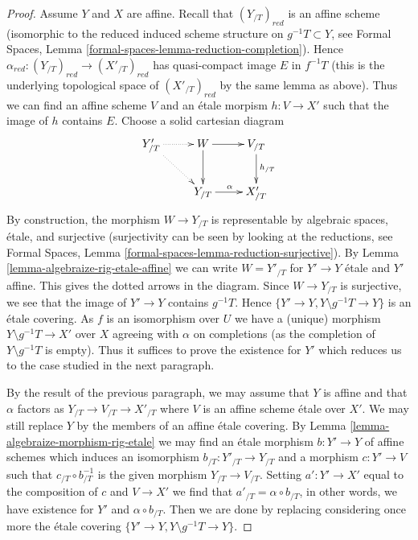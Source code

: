 \documentclass{stacks-project}
\theoremstyle{plain}
\theoremstyle{definition}
\theoremstyle{remark}
\numberwithin{equation}{subsection}
\begin{document}
\begin{proof}
\medskip\noindent
Assume $Y$ and $X$ are affine. Recall that $(Y_{/T})_{red}$
is an affine scheme (isomorphic to the reduced induced scheme structure
on $g^{-1}T \subset Y$, see Formal Spaces, Lemma
\ref{formal-spaces-lemma-reduction-completion}).
Hence $\alpha_{red} : (Y_{/T})_{red} \to (X'_{/T})_{red}$
has quasi-compact image $E$ in $f^{-1}T$ (this is the underlying
topological space of $(X'_{/T})_{red}$ by the same lemma as above).
Thus we can find an affine scheme $V$ and an \'etale morpism
$h : V \to X'$ such that the image of $h$ contains $E$.
Choose a solid cartesian diagram
$$
\xymatrix{
Y'_{/T} \ar@{..>}[rd] \ar@{..>}[r] &
W \ar[d] \ar[r] & V_{/T} \ar[d]^{h_{/T}} \\
& Y_{/T} \ar[r]^\alpha & X'_{/T}
}
$$
By construction, the morphism $W \to Y_{/T}$ is representable by
algebraic spaces, \'etale, and surjective
(surjectivity can be seen by looking at the reductions, see
Formal Spaces, Lemma
\ref{formal-spaces-lemma-reduction-surjective}).
By Lemma \ref{lemma-algebraize-rig-etale-affine}
we can write $W = Y'_{/T}$ for $Y' \to Y$ \'etale and $Y'$ affine.
This gives the dotted arrows in the diagram.
Since $W \to Y_{/T}$ is surjective, we see that
the image of $Y' \to Y$ contains $g^{-1}T$.
Hence $\{Y' \to Y, Y \setminus g^{-1}T \to Y\}$
is an \'etale covering. As $f$ is an isomorphism over $U$ we have a
(unique) morphism $Y \setminus g^{-1}T \to X'$ over $X$
agreeing with $\alpha$ on completions
(as the completion of $Y \setminus g^{-1}T$ is empty).
Thus it suffices to prove the existence for $Y'$
which reduces us to the case studied in the next paragraph.

\medskip\noindent
By the result of the previous paragraph, we may assume that $Y$ is affine
and that $\alpha$ factors as $Y_{/T} \to V_{/T} \to X'_{/T}$
where $V$ is an affine scheme \'etale over $X'$. We may still replace $Y$ by
the members of an affine \'etale covering.
By Lemma \ref{lemma-algebraize-morphism-rig-etale}
we may find an \'etale morphism $b : Y' \to Y$ of affine schemes
which induces an isomorphism $b_{/T} : Y'_{/T} \to Y_{/T}$
and a morphism $c : Y' \to V$ such that $c_{/T} \circ b_{/T}^{-1}$
is the given morphism $Y_{/T} \to V_{/T}$. Setting
$a' : Y' \to X'$ equal to the composition of $c$ and $V \to X'$
we find that $a'_{/T} = \alpha \circ b_{/T}$, in other words, we have
existence for $Y'$ and $\alpha \circ b_{/T}$.
Then we are done by replacing considering once more
the \'etale covering $\{Y' \to Y, Y \setminus g^{-1}T \to Y\}$.
\end{proof}
\end{document}

